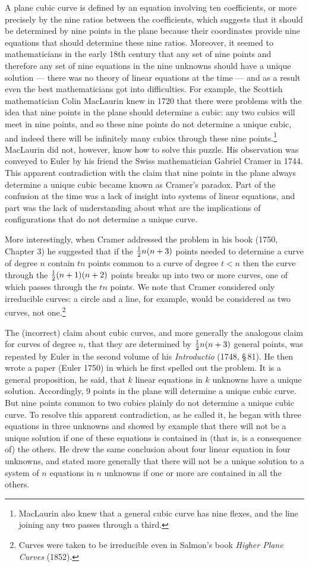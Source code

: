 A plane cubic curve is defined by an equation involving ten coefficients, or more precisely by the nine ratios between the coefficients, which suggests that it should be determined by nine points in the plane because their coordinates provide nine equations that should determine these nine ratios.  Moreover, it seemed to mathematicians in the early 18th century that any set of nine points and therefore any set of nine equations in the nine unknowns should have a unique solution --- there was no theory of linear equations at the time ---  and as a result even the best mathematicians got into difficulties. For example, the Scottish mathematician Colin MacLaurin  knew in 1720 that there were problems with the idea that nine points in the plane should determine a cubic: any two cubics will meet in nine points, and so these nine points do not determine a unique cubic, and indeed there will be infinitely many cubics through these nine points.\footnote{MacLaurin also knew that a general cubic curve has nine flexes, and the line joining any two passes through a third.}  MacLaurin did not, however, know how to solve this puzzle. His observation was conveyed to Euler by his friend the Swiss mathematician Gabriel Cramer  in 1744. This apparent contradiction with the claim that nine points in the plane always determine a unique cubic became known as Cramer's paradox.  Part of the confusion at the time was a lack of insight into systems of linear equations, and part was the lack of understanding about what are the implications of configurations that do not determine a unique curve. 

More interestingly, when Cramer addressed the problem in his book (1750, Chapter 3) he suggested that if the $\ha n(n+3)$ points needed to determine a curve of degree $n$ contain $tn$ points common to a curve of degree $t < n$ then the curve through the  $\ha (n+1)(n+2)$ points breaks up into two or more curves, one of which passes through the $tn$ points. We note that Cramer considered only irreducible curves: a circle and a line, for example, would be considered as two curves, not one.\footnote{Curves were taken to be irreducible even in Salmon's book \emph{Higher Plane Curves} (1852).} 


The (incorrect) claim about cubic curves, and more generally the analogous claim for curves of degree $n$, that they are determined by $\ha n(n+3)$ general points, was repeated  by  Euler  in the second volume of his \emph{Introductio} (1748, \S\,81). He then wrote a paper (Euler 1750) in which he first spelled out the problem. It is a general proposition, he said, that $k$ linear equations in $k$ unknowns have a unique solution. Accordingly, 9 points in the plane will determine a unique cubic curve. But nine points common to two cubics plainly do not determine a unique cubic curve. To resolve this apparent contradiction, as he called it, he began with  three equations in three unknowns and showed by example that there will not be a unique solution if one of these equations is contained in (that is, is a consequence of) the others. He drew the same conclusion about four linear equation in four unknowns, and stated more generally that there will not be a unique solution to a system of $n$ equations in $n$ unknowns if one or more are contained in all the others. 

